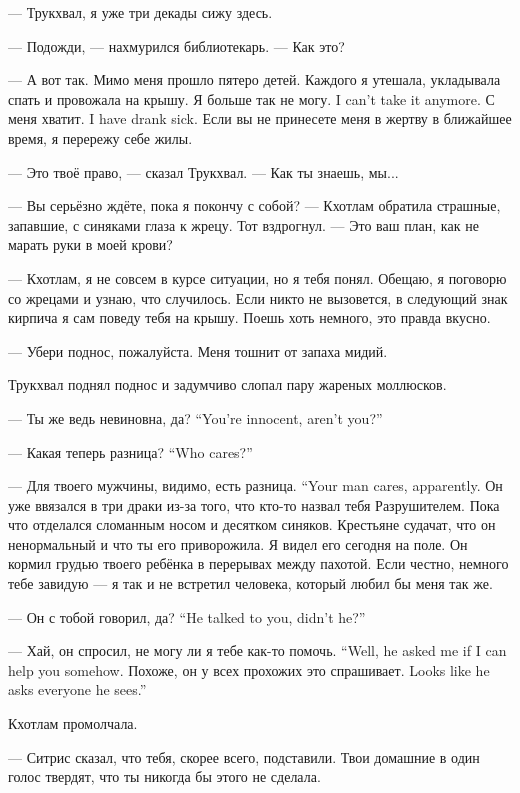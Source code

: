 --- Трукхвал, я уже три декады сижу здесь.

--- Подожди, --- нахмурился библиотекарь.
--- Как это?

--- А вот так.
Мимо меня прошло пятеро детей.
Каждого я утешала, укладывала спать и провожала на крышу.
{Я больше так не могу.}
{I can't take it anymore.}
{С меня хватит.}
{I have drank sick.}
Если вы не принесете меня в жертву в ближайшее время, я перережу себе жилы.

--- Это твоё право, --- сказал Трукхвал.
--- Как ты знаешь, мы...

--- Вы серьёзно ждёте, пока я покончу с собой? --- Кхотлам обратила страшные, запавшие, с синяками глаза к жрецу.
Тот вздрогнул.
--- Это ваш план, как не марать руки в моей крови?

--- Кхотлам, я не совсем в курсе ситуации, но я тебя понял.
Обещаю, я поговорю со жрецами и узнаю, что случилось.
Если никто не вызовется, в следующий знак кирпича я сам поведу тебя на крышу.
Поешь хоть немного, это правда вкусно.

--- Убери поднос, пожалуйста.
Меня тошнит от запаха мидий.

Трукхвал поднял поднос и задумчиво слопал пару жареных моллюсков.

{--- Ты же ведь невиновна, да?}
{``You're innocent, aren't you?''}

{--- Какая теперь разница?}
{``Who cares?''}

{--- Для твоего мужчины, видимо, есть разница.}
{``Your man cares, apparently.}
Он уже ввязался в три драки из-за того, что кто-то назвал тебя Разрушителем.
Пока что отделался сломанным носом и десятком синяков.
Крестьяне судачат, что он ненормальный и что ты его приворожила.
Я видел его сегодня на поле.
Он кормил грудью твоего ребёнка в перерывах между пахотой.
Если честно, немного тебе завидую --- я так и не встретил человека, который любил бы меня так же.

{--- Он с тобой говорил, да?}
{``He talked to you, didn't he?''}

{--- Хай, он спросил, не могу ли я тебе как-то помочь.}
{``Well, he asked me if I can help you somehow.}
{Похоже, он у всех прохожих это спрашивает.}
{Looks like he asks everyone he sees.''}

Кхотлам промолчала.

--- Ситрис сказал, что тебя, скорее всего, подставили.
Твои домашние в один голос твердят, что ты никогда бы этого не сделала.


